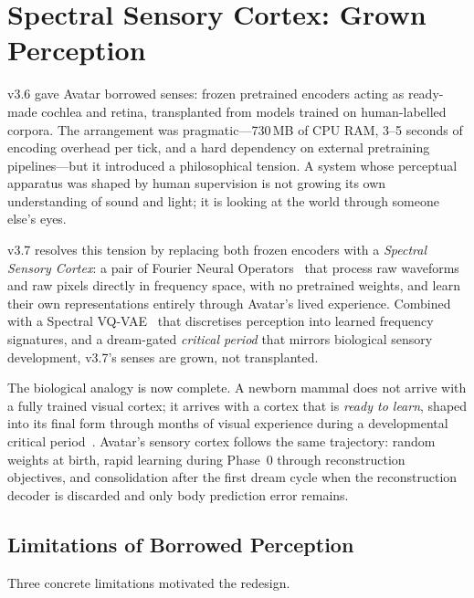 \section{Spectral Sensory Cortex: Grown Perception}
\label{sec:senses_v37}

v3.6 gave Avatar borrowed senses: frozen pretrained encoders acting as ready-made
cochlea and retina, transplanted from models trained on human-labelled corpora.
The arrangement was pragmatic---730\,MB of CPU RAM, 3--5 seconds of encoding overhead
per tick, and a hard dependency on external pretraining pipelines---but it introduced
a philosophical tension.
A system whose perceptual apparatus was shaped by human supervision is not growing its
own understanding of sound and light; it is looking at the world through someone else's
eyes.

v3.7 resolves this tension by replacing both frozen encoders with a \emph{Spectral
Sensory Cortex}: a pair of Fourier Neural Operators~\cite{fno2020} that process raw
waveforms and raw pixels directly in frequency space, with no pretrained weights, and
learn their own representations entirely through Avatar's lived experience.
Combined with a Spectral VQ-VAE~\cite{vqvae2017} that discretises perception into
learned frequency signatures, and a dream-gated \emph{critical period} that mirrors
biological sensory development, v3.7's senses are grown, not transplanted.

The biological analogy is now complete.
A newborn mammal does not arrive with a fully trained visual cortex; it arrives with
a cortex that is \emph{ready to learn}, shaped into its final form through months of
visual experience during a developmental critical period~\cite{hubel1970}.
Avatar's sensory cortex follows the same trajectory: random weights at birth, rapid
learning during Phase~0 through reconstruction objectives, and consolidation after the
first dream cycle when the reconstruction decoder is discarded and only body prediction
error remains.

\subsection{Limitations of Borrowed Perception}
\label{sec:v36_limitations}

Three concrete limitations motivated the redesign.

